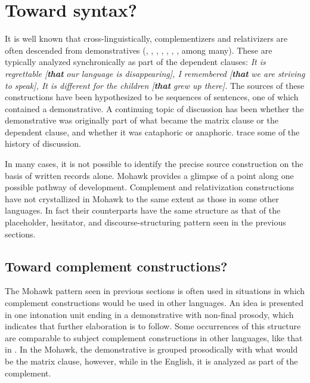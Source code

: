 \documentclass[output=paper]{langscibook}
\begin{document}
\section{Toward syntax?}
\label{sec:mithun:7}

It is well known that cross-linguistically, complementizers and relativizers are often descended from demonstratives (\citealt{Brugmann1904}, \citealt{Bühler1934}, \citealt{HopperTraugott2003}, \citealt{HarrisCampbell1995}, \citealt{Diessel1999,Diessel2006}, \citealt{HeineKuteva2007}, \citealt{DiesselBreunesse2020}, among many). These are typically analyzed synchronically as part of the dependent clauses: \textit{It is regrettable [}\textbf{\textit{that}} \textit{our language is disappearing], I remembered [}\textbf{\textit{that}} \textit{we are striving to speak], It is different for the children [}\textbf{\textit{that}} \textit{grew up there].} The sources of these constructions have been hypothesized to be sequences of sentences, one of which contained a demonstrative. A continuing topic of discussion has been whether the demonstrative was originally part of what became the matrix clause or the dependent clause, and whether it was cataphoric or anaphoric. \citet[308--310, 319--320]{DiesselBreunesse2020} trace some of the history of discussion.

In many cases, it is not possible to identify the precise source construction on the basis of written records alone. Mohawk provides a glimpse of a point along one possible pathway of development. Complement and relativization constructions have not crystallized in Mohawk to the same extent as those in some other languages. In fact their counterparts have the same structure as that of the placeholder, hesitator, and discourse-structuring pattern seen in the previous sections.

\subsection{Toward complement constructions?}
\label{sec:mithun:7.1}

The Mohawk pattern seen in previous sections is often used in situations in which complement constructions would be used in other languages. An idea is presented in one intonation unit ending in a demonstrative with non-final prosody, which indicates that further elaboration is to follow. Some occurrences of this structure are comparable to subject complement constructions in other languages, like that in . In the Mohawk, the demonstrative is grouped prosodically with what would be the matrix clause, however, while in the English, it is analyzed as part of the complement.
\end{document}
